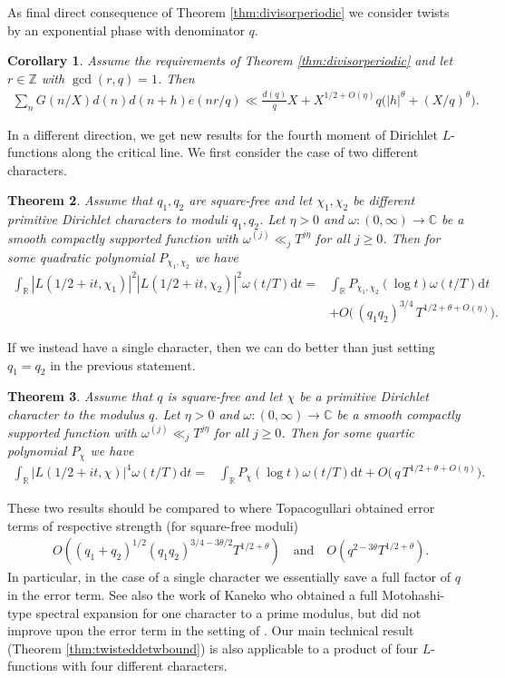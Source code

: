 \documentclass[12pt]{amsart}
\newtheorem{theorem}{Theorem}[section]
\newtheorem{corollary}[theorem]{Corollary}
\theoremstyle{definition}
\theoremstyle{remark}
\numberwithin{equation}{section}
\newcommand{\C}{{\mathbb C}}
\newcommand{\R}{{\mathbb R}}
\newcommand{\Z}{{\mathbb Z}}
\newcommand{\1}{{\mathbf 1}}
\renewcommand{\d}{\mathrm d}
\begin{document}
As final direct consequence of Theorem \ref{thm:divisorperiodic} we consider twists by an exponential phase with denominator $q$.
\begin{corollary} \label{cor:minorarc}
   Assume the requirements of Theorem \ref{thm:divisorperiodic} and let $r\in \Z$ with $\gcd(r,q)=1$. Then 
    \begin{align*}
        \sum_{n} G(n/X)d(n)d(n+h) e(n r/q) \ll \frac{d(q)}{q}X+X^{1/2+O(\eta)} q\bigg(|h|^{\theta}+(X/q)^{\theta}\bigg).
    \end{align*}
\end{corollary}


In a different direction, we get new results for the fourth moment of Dirichlet $L$-functions along the critical line. We first consider the case of two different characters.
\begin{theorem} \label{cor:Lfunction}
Assume that $q_1,q_2$ are square-free and let $\chi_1,\chi_2$ be different primitive Dirichlet characters to moduli $q_1,q_2$. Let $\eta>0$ and $\omega:(0,\infty)\to \C$ 
be a smooth compactly supported function with $\omega^{(j)} \ll_{j} T^{ j \eta }$ for all $j \geq 0$. Then for some quadratic polynomial $P_{\chi_1,\chi_2}$ we have 
    \begin{align*}
        \int_\R |L(1/2+it,\chi_1) |^2|L(1/2+it,\chi_2)|^2\omega(t/T) \d t= &\int_\R P_{\chi_1,\chi_2}(\log t) \omega(t/T) \d t  \\
        &+O\bigg(  \,(q_1q_2)^{3/4} \, T^{1/2+\theta+O(\eta)} \bigg).
    \end{align*}
\end{theorem} 
If we instead have a single character, then we can do better than just setting $q_1=q_2$ in the previous statement.
\begin{theorem} \label{cor:Lfunctiononechar}
Assume that $q$ is square-free and let $\chi$ be a primitive Dirichlet character to the modulus $q$. Let $\eta>0$ and $\omega:(0,\infty)\to \C$ 
be a smooth compactly supported function with $\omega^{(j)} \ll_{j} T^{ j \eta }$ for all $j \geq 0$. Then for some quartic polynomial $P_{\chi}$ we have
    \begin{align*}
        \int_\R |L(1/2+it,\chi) |^4\omega(t/T) \d t= &\int_\R P_{\chi}(\log t) \omega(t/T) \d t  +O\bigg(    \, q \, T^{1/2+\theta+ O(\eta)} \bigg).
    \end{align*}
\end{theorem}
These two results should be compared to \cite[Theorem 1.4, Theorem 1.2]{berke} where Topacogullari obtained error terms of respective strength (for square-free moduli)
\begin{align*}
    &O((q_1+q_2)^{1/2}(q_1q_2)^{3/4-3\theta /2}T^{1/2+\theta}) \quad \text{and} \quad O(q^{2-3\theta}T^{1/2+\theta}).
\end{align*}
In particular, in the case of a single character we essentially save a full factor of $q$ in the error term. See also the work of Kaneko \cite{Kaneko_2022} who obtained a full Motohashi-type spectral expansion for one character to a prime modulus, but did not improve upon the error term in the setting of \cite[Theorem 1.2]{berke}. Our main technical result (Theorem \ref{thm:twisteddetwbound}) is also applicable to a product of four $L$-functions with four different characters.
\end{document}
